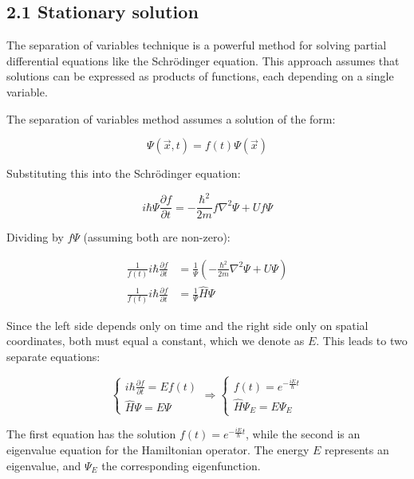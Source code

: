 \documentclass[10pt]{article}
\begin{document}
\subsection*{2.1 Stationary solution}

The separation of variables technique is a powerful method for solving partial differential equations like the Schrödinger equation. This approach assumes that solutions can be expressed as products of functions, each depending on a single variable.


The separation of variables method assumes a solution of the form:

\begin{equation*}
\Psi(\vec{x}, t) = f(t)\Psi(\vec{x}) \tag{2.1}
\end{equation*}

Substituting this into the Schrödinger equation:

\begin{equation*}
i\hbar\Psi\frac{\partial f}{\partial t} = -\frac{\hbar^2}{2m}f\nabla^2\Psi + Uf\Psi \tag{2.2}
\end{equation*}

Dividing by $f\Psi$ (assuming both are non-zero):

\begin{align*}
\frac{1}{f(t)}i\hbar\frac{\partial f}{\partial t} &= \frac{1}{\Psi}\left(-\frac{\hbar^2}{2m}\nabla^2\Psi + U\Psi\right) \\
\frac{1}{f(t)}i\hbar\frac{\partial f}{\partial t} &= \frac{1}{\Psi}\hat{H}\Psi \tag{2.3}
\end{align*}

Since the left side depends only on time and the right side only on spatial coordinates, both must equal a constant, which we denote as $E$. This leads to two separate equations:

\[
\left\{\begin{array}{l}
i\hbar\frac{\partial f}{\partial t} = Ef(t) \\
\hat{H}\Psi = E\Psi
\end{array}\right. \Rightarrow \left\{\begin{array}{l}
f(t) = e^{-\frac{iE}{\hbar}t} \\
\hat{H}\Psi_E = E\Psi_E
\end{array}\right. \tag{2.4}
\]

The first equation has the solution $f(t) = e^{-\frac{iE}{\hbar}t}$, while the second is an eigenvalue equation for the Hamiltonian operator. The energy $E$ represents an eigenvalue, and $\Psi_E$ the corresponding eigenfunction.
\end{document}
